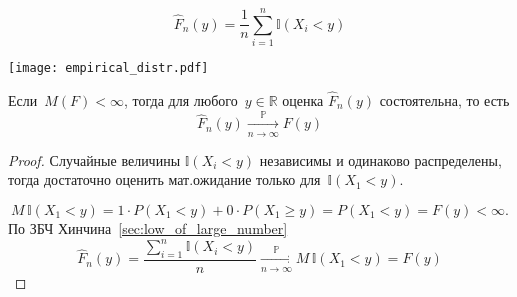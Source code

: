 \documentclass[../handbook.tex]{subfiles}
\begin{document}
\begin{equation}
    \label{eq:emirical_cdf}
    \hat F_n(y) = \frac1n \sum_{i=1}^n \mathbb{I}(X_i < y)
\end{equation}

\begin{marginfigure}
    \texttt{[image: empirical\_distr.pdf]}
    \label{fig:empirical_distr}
\end{marginfigure}

\begin{theorem}
    Если~$M(F) < \infty$, тогда для любого~$y\in\mathbb{R}$ оценка $\hat F_n(y)$ состоятельна, то есть
    \begin{equation}
        \label{eq:emp_cdf_theorem}
        \hat F_n(y) \xrightarrow[n \to \infty]{\mathbb{P}} F(y)%
    \end{equation}
\end{theorem}
\begin{proof}
    Случайные величины $\mathbb I(X_i < y)$ независимы и одинаково распределены, тогда достаточно оценить мат.ожидание только для~$\mathbb I(X_1 < y)$.

    \[
        M\,\mathbb I(X_1 < y) = 1 \cdot P(X_1 < y) + 0 \cdot P(X_1 \geq y) = P(X_1 < y) = F(y) < \infty.
    \]
По ЗБЧ Хинчина~\ref{sec:low_of_large_number}
\[
    \hat F_n(y) =
        \frac{\sum_{i=1}^n \mathbb{I}(X_i < y)}{n} 
        \xrightarrow[n \to \infty]{\mathbb{P}}
    M\,\mathbb I(X_1 < y)
    = F(y)
\]
\end{proof}
\end{document}
